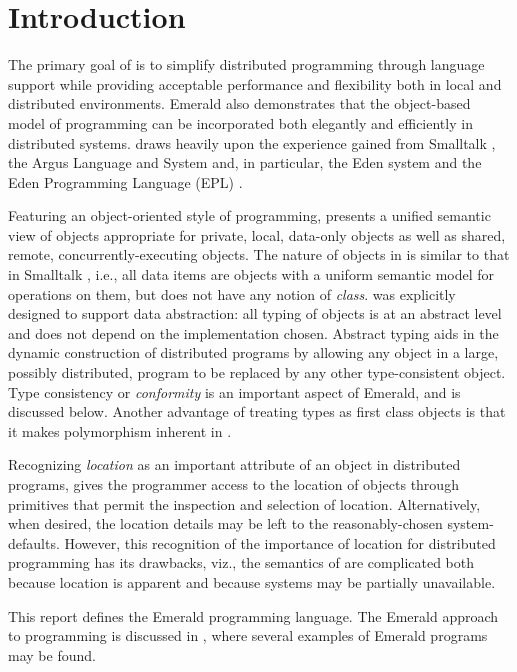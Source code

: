 \section{Introduction}

The primary goal of \emd{}
\cite{Black86-oopsla,Black87-tse,Jul88tocs,Raj90spe} is to simplify distributed
programming through language support while providing acceptable
performance and flexibility both in local and distributed environments.
Emerald also demonstrates that the object-based model of programming can
be incorporated both elegantly and efficiently in distributed systems.
\emd{} draws heavily upon the experience gained from
Smalltalk \cite{Goldberg83}, the Argus Language and System
\cite{Liskov84-argus} and, in particular, the Eden system
\cite{Almes85,Black85-eden-experiences} and the Eden Programming
Language (EPL) \cite{Black85-epl}.

Featuring an object-oriented style of programming, \emd{} presents
a unified semantic view of objects appropriate for
private, local, data-only objects as well as shared,
remote, concurrently-executing objects. The nature of objects in \emd{}
is similar to that in Smalltalk \cite{Goldberg83}, i.e., all 
data items are objects with a uniform semantic model for operations
on them, but \emd{} does not have any notion of {\em class}.
\emd{} was explicitly
designed to support data abstraction: all
typing of objects is at an abstract level and does not depend on the 
implementation chosen. Abstract typing aids
in the dynamic construction of distributed programs by allowing any object in
a large, possibly distributed, program to be replaced by any other
type-consistent object.
Type consistency or {\em conformity} is an important
aspect of Emerald, and is discussed below.
Another advantage of treating types as first class objects is 
that it makes polymorphism inherent in \emd{}.

Recognizing {\em location} as an important attribute of an object in
distributed programs, \emd{} gives the programmer access to the location
of objects through primitives that permit the inspection and selection of
location. Alternatively, when desired, the location details may be left
to the reasonably-chosen system-defaults.
However, this recognition of the importance of location 
for distributed programming has its drawbacks, viz., the semantics of \emd{}
are complicated both because location is apparent and because systems may
be partially unavailable.

This report defines the Emerald programming language.
The Emerald
approach to programming is discussed in \cite{Raj90spe}, where several
examples of Emerald programs may be found.

